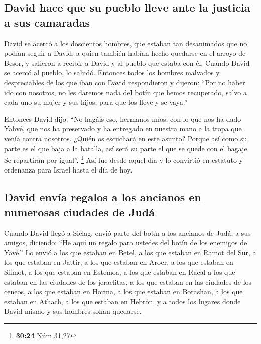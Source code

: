 \hypertarget{david-hace-que-su-pueblo-lleve-ante-la-justicia-a-sus-camaradas}{%
\subsection{David hace que su pueblo lleve ante la justicia a sus
camaradas}\label{david-hace-que-su-pueblo-lleve-ante-la-justicia-a-sus-camaradas}}

 David se acercó a los doscientos hombres, que estaban
tan desanimados que no podían seguir a David, a quien también habían
hecho quedarse en el arroyo de Besor, y salieron a recibir a David y al
pueblo que estaba con él. Cuando David se acercó al pueblo, lo saludó.
 Entonces todos los hombres malvados y despreciables de
los que iban con David respondieron y dijeron: ``Por no haber ido con
nosotros, no les daremos nada del botín que hemos recuperado, salvo a
cada uno su mujer y sus hijos, para que los lleve y se vaya.''

 Entonces David dijo: ``No hagáis eso, hermanos míos, con
lo que nos ha dado Yahvé, que nos ha preservado y ha entregado en
nuestra mano a la tropa que venía contra nosotros. 
¿Quién os escuchará en este asunto? Porque así como su parte es el que
baja a la batalla, así será su parte el que se quede con el bagaje. Se
repartirán por igual''. \footnote{\textbf{30:24} Núm 31,27}
 Así fue desde aquel día y lo convirtió en estatuto y
ordenanza para Israel hasta el día de hoy.

\hypertarget{david-envuxeda-regalos-a-los-ancianos-en-numerosas-ciudades-de-juduxe1}{%
\subsection{David envía regalos a los ancianos en numerosas ciudades de
Judá}\label{david-envuxeda-regalos-a-los-ancianos-en-numerosas-ciudades-de-juduxe1}}

 Cuando David llegó a Siclag, envió parte del botín a los
ancianos de Judá, a sus amigos, diciendo: ``He aquí un regalo para
ustedes del botín de los enemigos de Yavé.''  Lo envió a
los que estaban en Betel, a los que estaban en Ramot del Sur, a los que
estaban en Jattir,  a los que estaban en Aroer, a los que
estaban en Sifmot, a los que estaban en Estemoa,  a los
que estaban en Racal a los que estaban en las ciudades de los
jeraelitas, a los que estaban en las ciudades de los ceneos,
 a los que estaban en Horma, a los que estaban en
Borashan, a los que estaban en Athach,  a los que estaban
en Hebrón, y a todos los lugares donde David mismo y sus hombres solían
quedarse.

